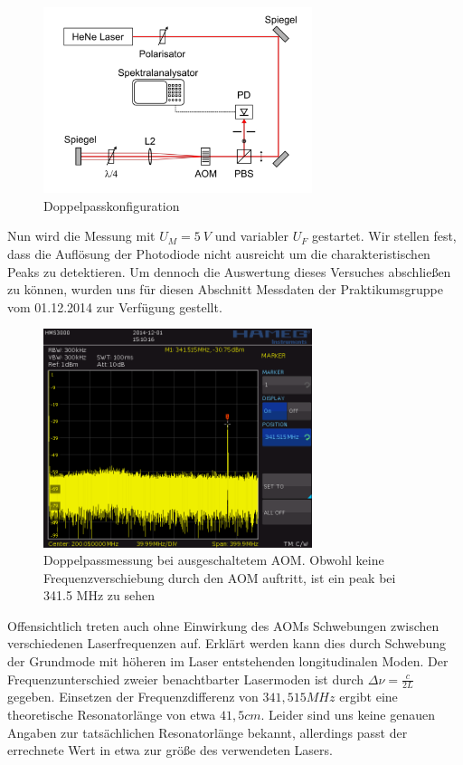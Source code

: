 \documentclass[bigchapter,colorback,accentcolor=tud4b,linedtoc,11pt]{tudreport}
\begin{document}
\begin{figure}[H] 
  \centering
     \includegraphics[width=0.7\textwidth]{img/doppelpass.jpg}
  \caption[Cap for listoffigures]{Doppelpasskonfiguration \cite{Anleitung}}
  \label{fig:Bild3}
\end{figure}

Nun wird die Messung mit $U_M = 5~V$ und variabler $U_F$ gestartet. Wir stellen fest, dass die Auflösung der Photodiode nicht ausreicht um die charakteristischen Peaks zu detektieren. Um dennoch die Auswertung dieses Versuches abschließen zu können, wurden uns für diesen Abschnitt Messdaten der Praktikumsgruppe vom 01.12.2014 zur Verfügung gestellt.

\begin{figure}[H]
  \centering
     \includegraphics[width=0.7\textwidth]{data/Aufgabe6/aom_aus.png}
  \caption[Cap for listoffigures]{Doppelpassmessung bei ausgeschaltetem AOM. Obwohl keine Frequenzverschiebung durch den AOM auftritt, ist ein peak bei 341.5 MHz zu sehen\cite{AndereGruppe}}
  \label{fig:Bild4}
\end{figure}

Offensichtlich treten auch ohne Einwirkung des AOMs Schwebungen zwischen verschiedenen Laserfrequenzen auf. Erklärt werden kann dies durch Schwebung der Grundmode mit höheren im Laser entstehenden longitudinalen Moden. Der Frequenzunterschied zweier benachtbarter Lasermoden ist durch $\Delta \nu = \frac{c}{2L}$ gegeben. Einsetzen der Frequenzdifferenz von $341,515MHz$ ergibt eine theoretische Resonatorlänge von etwa $41,5cm$. Leider sind uns keine genauen Angaben zur tatsächlichen Resonatorlänge bekannt, allerdings passt der errechnete Wert in etwa zur größe des verwendeten Lasers.
\end{document}
